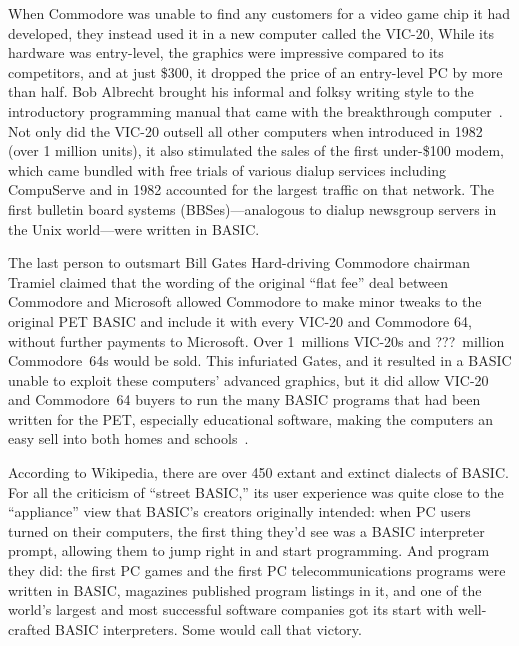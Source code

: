 When Commodore was unable to find any customers for a video game chip it
had developed, they instead used it in a new computer called the VIC-20,
While its hardware was entry-level, the graphics were impressive
compared to its competitors, and at just \$300, it dropped the price of
an entry-level PC by more than half.
Bob Albrecht brought his informal and folksy writing style to the
introductory programming manual that came with the breakthrough
computer~\cite{commodore}.
Not only did the VIC-20 outsell all other computers when introduced in
1982 (over 1 million units), it also stimulated the sales of the
first under-\$100 modem, which came bundled with free trials of various
dialup services including CompuServe and in 1982 accounted for the
largest traffic on that network.  The first bulletin board systems
(BBSes)---analogous to dialup newsgroup servers in the Unix world---were
written in BASIC.

\begin{tangent}{The last person to outsmart Bill Gates}
Hard-driving Commodore chairman Tramiel claimed that the wording of the
original ``flat fee'' deal between Commodore and Microsoft allowed
Commodore to make minor tweaks to the original PET BASIC and include it
with every VIC-20 and Commodore 64, without further payments to
Microsoft.
Over 1~millions VIC-20s and ???~million Commodore~64s would be sold.
This infuriated Gates, and it resulted in a BASIC unable to exploit
these computers' advanced graphics, but it did allow VIC-20 and
Commodore~64 buyers to run the many BASIC programs that had been written
for the PET, especially educational software, making the computers an
easy sell into both homes and schools~\cite[p. 414]{commodore}.

\end{tangent}

According to Wikipedia, there are over 450 extant and extinct dialects
of BASIC.
For all the criticism of ``street BASIC,'' its user experience was quite
close to the ``appliance'' view that BASIC's creators originally
intended: when PC users turned on their computers, the first thing
they'd see was a BASIC interpreter prompt, allowing them to jump right
in and start programming.  And program they did:
the first PC games and the first PC telecommunications programs were
written in BASIC, 
magazines published program listings in it, and one of the world's
largest and most successful software companies got its start with
well-crafted BASIC interpreters.  Some would call that victory.
